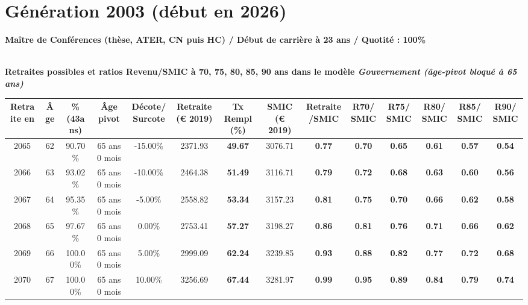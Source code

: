 \newpage 
 
\section{Génération 2003 (début en 2026)\label{MCF_100_2003_23_0}} 
 
{\bf \noindent Maître de Conférences (thèse, ATER, CN puis HC) / Début de carrière à 23 ans / Quotité : 100\%}  ~ 

 ~\\{\bf \noindent Retraites possibles et ratios Revenu/SMIC à 70, 75, 80, 85, 90 ans dans le modèle \emph{Gouvernement (âge-pivot bloqué à 65 ans)}}  
 
\begin{adjustbox}{max width=\textwidth} 
\begin{tabular}[htb]{|c|c||c|c|c||c|c||c|c||c|c|c|c|c|} 
\hline 
 Retraite en &  Âge &  \%(43ans) &  Âge pivot &  Décote/Surcote &  Retraite (\euro{} 2019) &  Tx Rempl(\%) &  SMIC (\euro{} 2019) &  Retraite/SMIC &  R70/SMIC &  R75/SMIC &  R80/SMIC &  R85/SMIC &  R90/SMIC \\ 
\hline \hline 
 2065 &  62 &  90.70\% &  65 ans 0 mois &  -15.00\% &  2371.93 &  {\bf 49.67} &  3076.71 &  {\bf {\color{red} 0.77}} &  {\bf {\color{red} 0.70}} &  {\bf {\color{red} 0.65}} &  {\bf {\color{red} 0.61}} &  {\bf {\color{red} 0.57}} &  {\bf {\color{red} 0.54}} \\ 
\hline 
 2066 &  63 &  93.02\% &  65 ans 0 mois &  -10.00\% &  2464.38 &  {\bf 51.49} &  3116.71 &  {\bf {\color{red} 0.79}} &  {\bf {\color{red} 0.72}} &  {\bf {\color{red} 0.68}} &  {\bf {\color{red} 0.63}} &  {\bf {\color{red} 0.60}} &  {\bf {\color{red} 0.56}} \\ 
\hline 
 2067 &  64 &  95.35\% &  65 ans 0 mois &  -5.00\% &  2558.82 &  {\bf 53.34} &  3157.23 &  {\bf {\color{red} 0.81}} &  {\bf {\color{red} 0.75}} &  {\bf {\color{red} 0.70}} &  {\bf {\color{red} 0.66}} &  {\bf {\color{red} 0.62}} &  {\bf {\color{red} 0.58}} \\ 
\hline 
 2068 &  65 &  97.67\% &  65 ans 0 mois &  0.00\% &  2753.41 &  {\bf 57.27} &  3198.27 &  {\bf {\color{red} 0.86}} &  {\bf {\color{red} 0.81}} &  {\bf {\color{red} 0.76}} &  {\bf {\color{red} 0.71}} &  {\bf {\color{red} 0.66}} &  {\bf {\color{red} 0.62}} \\ 
\hline 
 2069 &  66 &  100.00\% &  65 ans 0 mois &  5.00\% &  2999.09 &  {\bf 62.24} &  3239.85 &  {\bf {\color{red} 0.93}} &  {\bf {\color{red} 0.88}} &  {\bf {\color{red} 0.82}} &  {\bf {\color{red} 0.77}} &  {\bf {\color{red} 0.72}} &  {\bf {\color{red} 0.68}} \\ 
\hline 
 2070 &  67 &  100.00\% &  65 ans 0 mois &  10.00\% &  3256.69 &  {\bf 67.44} &  3281.97 &  {\bf {\color{red} 0.99}} &  {\bf {\color{red} 0.95}} &  {\bf {\color{red} 0.89}} &  {\bf {\color{red} 0.84}} &  {\bf {\color{red} 0.79}} &  {\bf {\color{red} 0.74}} \\ 
\hline 
\hline 
\end{tabular} 
\end{adjustbox} 
 
